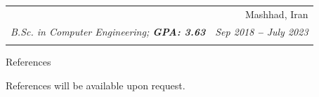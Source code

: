 \documentclass[letterpaper,12pt]{article}
\makeatletter
\newcommand{\resumeItem}[1]{
  \item\small{
    {#1 \vspace{-2pt}}
  }
}
\newcommand{\resumeSubheading}[4]{
  \vspace{-2pt}\item
    \begin{tabular*}{0.97\textwidth}[t]{l@{\extracolsep{\fill}}r}
      \textbf{#1} & #2 \\
      \textit{\small#3} & \textit{\small #4} \\
    \end{tabular*}\vspace{-7pt}
}
\newcommand{\resumeEducationHeading}[6]{
  \vspace{-2pt}\item
    \begin{tabular*}{0.97\textwidth}[t]{l@{\extracolsep{\fill}}r}
      \textbf{#1} & #2 \\
      \textit{\small#3} & \textit{\small #4} \\
      \textit{\small#5} & \textit{\small #6} \\
    \end{tabular*}\vspace{-14pt}
}
\newcommand{\resumeSubHeadingListStart}{\begin{itemize}[leftmargin=0.15in, label={}]}
\newcommand{\resumeSubHeadingListEnd}{\end{itemize}}
\newcommand{\resumeItemListStart}{\begin{itemize}}
\newcommand{\resumeItemListEnd}{\end{itemize}\vspace{-5pt}}
\makeatother
\begin{document}
    \resumeEducationHeading
      {\href{https://www.shorturl.at/bnov6}{Ferdowsi University of Mashhad}
      
      }{Mashhad, Iran}
      {B.Sc. in Computer Engineering;   \textbf{GPA: 3.63 }}{Sep 2018 \textbf{--} July 2023 }
 
        
    
  \resumeSubHeadingListEnd




\section{References}

References will be available upon request.





\end{document}

